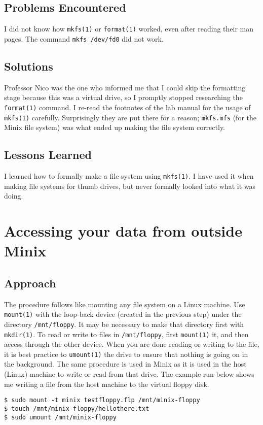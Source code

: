 \documentclass[11pt]{article}
\begin{document}
\subsection{Problems Encountered}
I did not know how {\tt mkfs(1)} or {\tt format(1)} worked, even after reading their man pages. The command {\tt mkfs /dev/fd0} did not work.

\subsection{Solutions}
Professor Nico was the one who informed me that I could skip the formatting stage because this was a virtual drive, so I promptly stopped researching the {\tt format(1)} command. I re-read the footnotes of the lab manual for the usage of {\tt mkfs(1)} carefully. Surprisingly they are put there for a reason; {\tt mkfs.mfs} (for the {\sc Minix} file system) was what ended up making the file system correctly.

\subsection{Lessons Learned}
I learned how to formally make a file system using {\tt mkfs(1)}. I have used it when making file systems for thumb drives, but never formally looked into what it was doing.

\section{Accessing your data from outside {\sc Minix}}
\subsection{Approach}
The procedure follows like mounting any file system on a Linux machine. Use {\tt mount(1)} with the loop-back device (created in the previous step) under the directory {\tt /mnt/floppy}. It may be necessary to make that directory first with {\tt mkdir(1)}. To read or write to files in {\tt /mnt/floppy}, first {\tt mount(1)} it, and then access through the other device. When you are done reading or writing to the file, it is best practice to {\tt umount(1)} the drive to ensure that nothing is going on in the background. The same procedure is used in {\sc Minix} as it is used in the host (Linux) machine to write or read from that drive. The example run below shows me writing a file from the host machine to the virtual floppy disk.

\begin{verbatim}
$ sudo mount -t minix testfloppy.flp /mnt/minix-floppy
$ touch /mnt/minix-floppy/hellothere.txt
$ sudo umount /mnt/minix-floppy
\end{verbatim}
\end{document}
